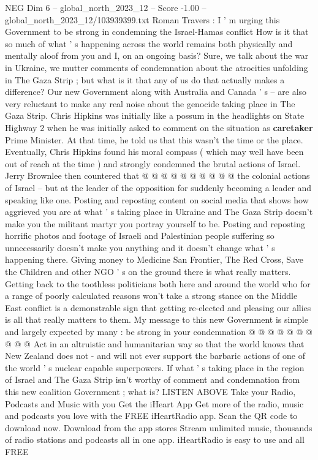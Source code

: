 \begin{textsample}{NEG Dim 6 – global\_north\_2023\_12 – Score -1.00 – global\_north\_2023\_12/103939399.txt}  \label{ex:f6_neg_256}
Roman Travers : I ' m urging this Government to be strong in condemning the Israel-Hamas conflict How is it that so much of what ' s happening across the world remains both physically and mentally aloof from you and I, on an ongoing basis?
Sure, we talk about the war in Ukraine, we mutter comments of condemnation about the atrocities unfolding in The Gaza Strip ; but what is it that any of us do that actually makes a difference?
Our new Government along with Australia and Canada ' s -- are also very reluctant to make any real noise about the genocide taking place in The Gaza Strip.
Chris Hipkins was initially like a possum in the headlights on State Highway 2 when he was initially asked to comment on the situation as \textbf{caretaker} Prime Minister.
At that time, he told us that this wasn't the time or the place.
Eventually, Chris Hipkins found his moral compass ( which may well have been out of reach at the time ) and strongly condemned the brutal actions of Israel.
Jerry Brownlee then countered that @ @ @ @ @ @ @ @ @ @ the colonial actions of Israel -- but at the leader of the opposition for suddenly becoming a leader and speaking like one.
Posting and reposting content on social media that shows how aggrieved you are at what ' s taking place in Ukraine and The Gaza Strip doesn't make you the militant martyr you portray yourself to be.
Posting and reposting horrific photos and footage of Israeli and Palestinian people suffering so unnecessarily doesn't make you anything and it doesn't change what ' s happening there.
Giving money to Medicine San Frontier, The Red Cross, Save the Children and other NGO ' s on the ground there is what really matters.
Getting back to the toothless politicians both here and around the world who for a range of poorly calculated reasons won't take a strong stance on the Middle East conflict is a demonstrable sign that getting re-elected and pleasing our allies is all that really matters to them.
My message to this new Government is simple and largely expected by many : be strong in your condemnation @ @ @ @ @ @ @ @ @ @ Act in an altruistic and humanitarian way so that the world knows that New Zealand does not - and will not ever support the barbaric actions of one of the world ' s nuclear capable superpowers.
If what ' s taking place in the region of Israel and The Gaza Strip isn't worthy of comment and condemnation from this new coalition Government ; what is?
LISTEN ABOVE Take your Radio, Podcasts and Music with you Get the iHeart App Get more of the radio, music and podcasts you love with the FREE iHeartRadio app.
Scan the QR code to download now.
Download from the app stores Stream unlimited music, thousands of radio stations and podcasts all in one app. iHeartRadio is easy to use and all FREE

\end{textsample}
